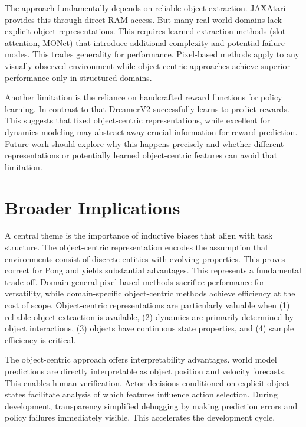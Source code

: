 \documentclass[
	english,
	ruledheaders=section,
	class=report,
	thesis={type=master},
	accentcolor=9c,
	custommargins=true,
	marginpar=false,
	parskip=half-,
	fontsize=11pt,
	pdfa=true,
]{tudapub}
\newcommand{\worldmodel}{world model}
\begin{document}
The approach fundamentally depends on reliable object extraction. JAXAtari
provides this through direct RAM access. But many real-world domains lack
explicit object representations. This requires learned extraction methods (slot
attention, MONet) that introduce additional complexity and potential failure
modes. This trades generality for performance. Pixel-based methods apply to any
visually observed environment while object-centric approaches achieve superior
performance only in structured domains.

Another limitation is the reliance on handcrafted reward functions for policy
learning. In contrast to that DreamerV2 successfully learns to predict rewards. This suggests that fixed object-centric representations, while excellent for
dynamics modeling may abstract away crucial information for reward prediction.
Future work should explore why this happens precisely and whether different
representations or potentially learned object-centric features can avoid that limitation.


\section{Broader Implications}
\label{sec:broader_implications}

A central theme is the importance of inductive biases that align with task
structure. The object-centric representation encodes the assumption that
environments consist of discrete entities with evolving properties. This proves
correct for Pong and yields substantial advantages. This represents a
fundamental trade-off. Domain-general pixel-based methods sacrifice performance
for versatility, while domain-specific object-centric methods achieve
efficiency at the cost of scope. Object-centric representations are
particularly valuable when (1) reliable object extraction is available, (2)
dynamics are primarily determined by object interactions, (3) objects have
continuous state properties, and (4) sample efficiency is critical.

The object-centric approach offers interpretability advantages. \worldmodel{}
predictions are directly interpretable as object position and velocity
forecasts. This enables human verification. Actor decisions conditioned on
explicit object states facilitate analysis of which features influence action
selection. During development, transparency simplified debugging by making
prediction errors and policy failures immediately visible. This accelerates the
development cycle.
\end{document}
